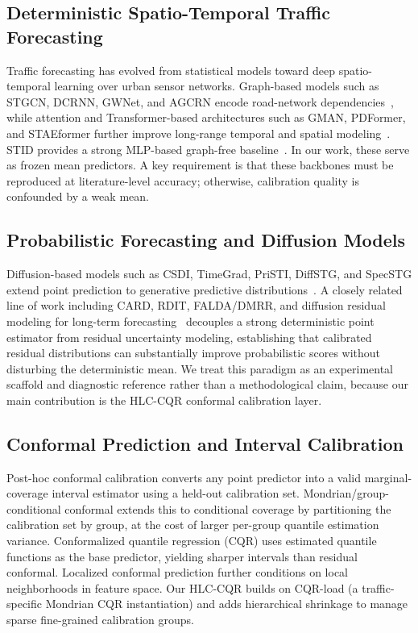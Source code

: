 \documentclass[letterpaper,journal]{IEEEtran}
\begin{document}
\subsection{Deterministic Spatio-Temporal Traffic Forecasting}
Traffic forecasting has evolved from statistical models toward deep
spatio-temporal learning over urban sensor networks.  Graph-based models
such as STGCN, DCRNN, GWNet, and AGCRN encode road-network
dependencies~\cite{yu2018stgcn,li2018dcrnn,wu2019graphwavenet,bai2020agcrn},
while attention and Transformer-based architectures such as GMAN, PDFormer,
and STAEformer further improve long-range temporal and spatial
modeling~\cite{zheng2020gman,jiang2023pdformer,liu2023staeformer}.  STID
provides a strong MLP-based graph-free baseline~\cite{shao2022stid}.  In
our work, these serve as frozen mean predictors.  A key requirement is that
these backbones must be reproduced at literature-level accuracy; otherwise,
calibration quality is confounded by a weak mean.

\subsection{Probabilistic Forecasting and Diffusion Models}
Diffusion-based models such as CSDI, TimeGrad, PriSTI, DiffSTG, and
SpecSTG extend point prediction to generative predictive
distributions~\cite{tashiro2021csdi,rasul2021timegrad,liu2023pristi,wen2023diffstg,lin2024specstg}.
A closely related line of work including CARD, RDIT, FALDA/DMRR, and
diffusion residual modeling for long-term
forecasting~\cite{han2022card,lai2025rdit,wang2025falda,qi2026diffusionresidual}
decouples a strong deterministic point estimator from residual uncertainty
modeling, establishing that calibrated residual distributions can substantially
improve probabilistic scores without disturbing the deterministic mean.  We
treat this paradigm as an experimental scaffold and diagnostic reference
rather than a methodological claim, because our main contribution is the
HLC-CQR conformal calibration layer.

\subsection{Conformal Prediction and Interval Calibration}
Post-hoc conformal calibration converts any point predictor into a
valid marginal-coverage interval estimator using a held-out calibration set.
Mondrian/group-conditional conformal extends this to conditional coverage
by partitioning the calibration set by group, at the cost of larger
per-group quantile estimation variance.  Conformalized quantile regression
(CQR) uses estimated quantile functions as the base predictor, yielding
sharper intervals than residual conformal.  Localized conformal prediction
further conditions on local neighborhoods in feature space.  Our HLC-CQR
builds on CQR-load (a traffic-specific Mondrian CQR instantiation) and adds
hierarchical shrinkage to manage sparse fine-grained calibration groups.
\end{document}
